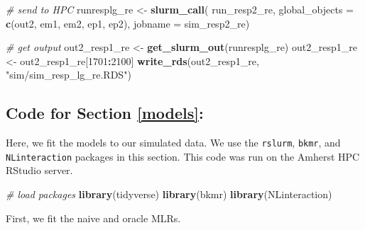 \documentclass[12pt, twoside]{amherstthesis}
\newenvironment{Shaded}{\begin{snugshade}}{\end{snugshade}}
\newcommand{\AttributeTok}[1]{\textcolor[rgb]{0.13,0.29,0.53}{#1}}
\newcommand{\CommentTok}[1]{\textcolor[rgb]{0.56,0.35,0.01}{\textit{#1}}}
\newcommand{\DecValTok}[1]{\textcolor[rgb]{0.00,0.00,0.81}{#1}}
\newcommand{\FunctionTok}[1]{\textcolor[rgb]{0.13,0.29,0.53}{\textbf{#1}}}
\newcommand{\NormalTok}[1]{#1}
\newcommand{\OtherTok}[1]{\textcolor[rgb]{0.56,0.35,0.01}{#1}}
\newcommand{\SpecialCharTok}[1]{\textcolor[rgb]{0.81,0.36,0.00}{\textbf{#1}}}
\newcommand{\StringTok}[1]{\textcolor[rgb]{0.31,0.60,0.02}{#1}}
\begin{document}
\begin{Shaded}
\begin{Highlighting}[]
\CommentTok{\# send to HPC}
\NormalTok{runresplg\_re }\OtherTok{\textless{}{-}} \FunctionTok{slurm\_call}\NormalTok{(}
\NormalTok{  run\_resp2\_re, }
  \AttributeTok{global\_objects =} \FunctionTok{c}\NormalTok{(}\StringTok{\textquotesingle{}out2\textquotesingle{}}\NormalTok{, }
                     \StringTok{\textquotesingle{}em1\textquotesingle{}}\NormalTok{, }\StringTok{\textquotesingle{}em2\textquotesingle{}}\NormalTok{, }\StringTok{\textquotesingle{}ep1\textquotesingle{}}\NormalTok{, }\StringTok{\textquotesingle{}ep2\textquotesingle{}}\NormalTok{),}
  \AttributeTok{jobname =} \StringTok{\textquotesingle{}sim\_resp2\_re\textquotesingle{}}\NormalTok{)}

\CommentTok{\# get output}
\NormalTok{out2\_resp1\_re }\OtherTok{\textless{}{-}} \FunctionTok{get\_slurm\_out}\NormalTok{(runresplg\_re)}
\NormalTok{out2\_resp1\_re }\OtherTok{\textless{}{-}}\NormalTok{ out2\_resp1\_re[}\DecValTok{1701}\SpecialCharTok{:}\DecValTok{2100}\NormalTok{]}
\FunctionTok{write\_rds}\NormalTok{(out2\_resp1\_re, }\StringTok{"sim/sim\_resp\_lg\_re.RDS"}\NormalTok{)}
\end{Highlighting}
\end{Shaded}
\normalsize

\hypertarget{code-for-section-refmodels}{%
\subsection{Code for Section \ref{models}:}\label{code-for-section-refmodels}}

Here, we fit the models to our simulated data. We use the \texttt{rslurm}, \texttt{bkmr}, and \texttt{NLinteraction} packages in this section. This code was run on the Amherst HPC RStudio server.

\scriptsize
\begin{Shaded}
\begin{Highlighting}[]
\CommentTok{\# load packages }
\FunctionTok{library}\NormalTok{(tidyverse)}
\FunctionTok{library}\NormalTok{(bkmr)}
\FunctionTok{library}\NormalTok{(NLinteraction)}
\end{Highlighting}
\end{Shaded}
\normalsize

First, we fit the naive and oracle MLRs.
\end{document}
